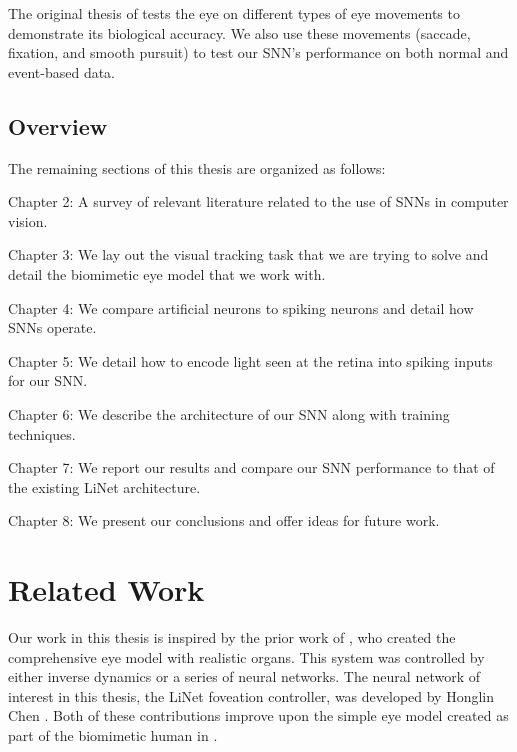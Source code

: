 \documentclass [MS] {UCLAthesis}
\begin{document}
The original thesis of \citet{Arjun} tests the eye on different types of eye movements to demonstrate its biological accuracy. We also use these movements (saccade, fixation, and smooth pursuit) to test our SNN's performance on both normal and event-based data.


\section{Overview}

The remaining sections of this thesis are organized as follows:

Chapter 2: A survey of relevant literature related to the use of SNNs in computer vision.

Chapter 3: We lay out the visual tracking task that we are trying to solve and detail the biomimetic eye model that we work with.

Chapter 4: We compare artificial neurons to spiking neurons and detail how SNNs operate.

Chapter 5: We detail how to encode light seen at the retina into spiking inputs for our SNN.

Chapter 6: We describe the architecture of our SNN along with training techniques.

Chapter 7: We report our results and compare our SNN performance to that of the existing LiNet architecture.

Chapter 8: We present our conclusions and offer ideas for future work.


\chapter{Related Work}

Our work in this thesis is inspired by the prior work of \citet{Arjun_thesis}, who created the comprehensive eye model with realistic organs. This system was controlled by either inverse dynamics or a series of neural networks. The neural network of interest in this thesis, the LiNet foveation controller, was developed by Honglin Chen \citep{Arjun}. Both of these contributions improve upon the simple eye model created as part of the biomimetic human in \citet{Masaki}.
\end{document}
